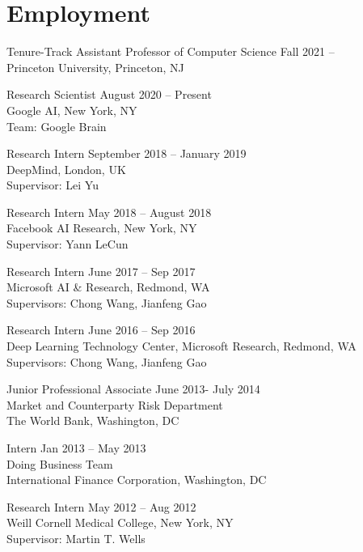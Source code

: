 \documentclass[letterpaper,200pt]{article}
\renewenvironment{itemize}{
  \begin{list}{}{
    \setlength{\leftmargin}{1.5em}
  }
}{
  \end{list}
}
\begin{document}
\section*{Employment}
\begin{itemize}
	\item Tenure-Track Assistant Professor of Computer Science \hfill{Fall 2021 -- \\}
	         Princeton University, 
	         Princeton, NJ
	\item Research Scientist \hfill{August 2020 -- Present\\}
	         Google AI, 
	         New York, NY\\
	         Team: Google Brain
        \item Research Intern \hfill{September 2018 -- January 2019\\}
                 DeepMind,
                 London, UK \\
                 Supervisor: Lei Yu
	\item Research Intern \hfill{May 2018 -- August 2018\\}
		Facebook AI Research, 
		New York, NY\\
		Supervisor: Yann LeCun
	\item Research Intern \hfill{June 2017 -- Sep 2017\\}
		Microsoft AI \& Research, 
		Redmond, WA\\
		Supervisors: Chong Wang, Jianfeng Gao
	\item Research Intern \hfill{June 2016 -- Sep 2016\\}
		Deep Learning Technology Center, Microsoft Research, 
		Redmond, WA\\
		Supervisors: Chong Wang, Jianfeng Gao
	\item Junior Professional Associate  \hfill{June 2013- July 2014\\}
		Market and Counterparty Risk Department\\
		The World Bank, 
		Washington, DC
	\item Intern  \hfill{Jan 2013 -- May 2013\\}
		Doing Business Team\\
		International Finance Corporation,
		Washington, DC
	\item Research Intern \hfill{May 2012 -- Aug 2012\\}
		Weill Cornell Medical College, 
		New York, NY\\
		Supervisor: Martin T. Wells
\end{itemize}
\end{document}
